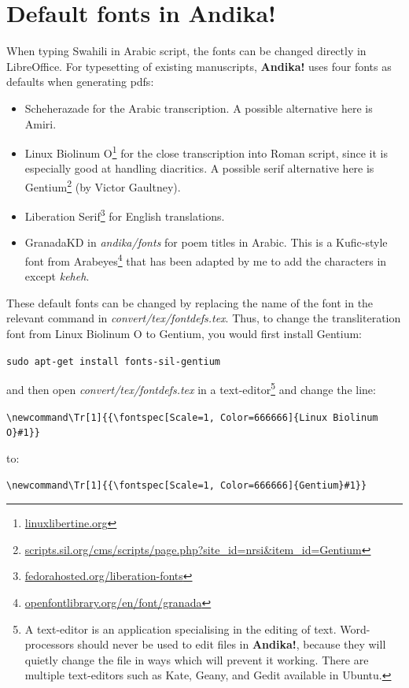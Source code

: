 \section{Default fonts in \textbf{Andika!}}
\label{s:changefont}

When typing Swahili in Arabic script, the fonts can be changed directly in LibreOffice.  For typesetting of existing manuscripts,  \textbf{Andika!} uses four fonts as defaults when generating pdfs:
\begin{itemize}
\item Scheherazade for the Arabic transcription.  A possible alternative here is Amiri.
\item Linux Biolinum O\footnote{\url{linuxlibertine.org}} for the close transcription into Roman script, since it is especially good at handling diacritics.  A possible serif alternative here is Gentium\footnote{\url{scripts.sil.org/cms/scripts/page.php?site_id=nrsi&item_id=Gentium}} (by Victor Gaultney).
\item Liberation Serif\footnote{\url{fedorahosted.org/liberation-fonts}} for English translations.
\item GranadaKD in \textit{andika/fonts} for poem titles in Arabic.  This is a Kufic-style font from Arabeyes\footnote{\url{openfontlibrary.org/en/font/granada}} that has been adapted by me to add the characters in  except \textit{keheh}.
\end{itemize}

These default fonts can be changed by replacing the name of the font in the relevant command in \textit{convert/tex/fontdefs.tex}.  Thus, to change the transliteration font from Linux Biolinum O to Gentium, you would first install Gentium:

\verb|sudo apt-get install fonts-sil-gentium|

and then open \textit{convert/tex/fontdefs.tex} in a text-editor\footnote{A text-editor is an application specialising in the editing of text.  Word-processors should never be used to edit files in \textbf{Andika!}, because they will quietly change the file in ways which will prevent it working.  There are multiple text-editors such as Kate, Geany, and Gedit available in Ubuntu.} and change the line:

\verb|\newcommand\Tr[1]{{\fontspec[Scale=1, Color=666666]{Linux Biolinum O}#1}}|

to:

\verb|\newcommand\Tr[1]{{\fontspec[Scale=1, Color=666666]{Gentium}#1}}|

